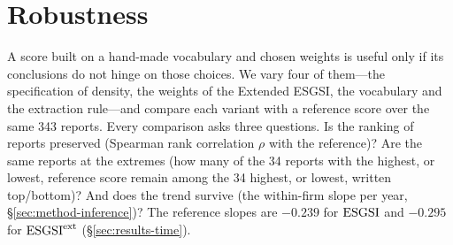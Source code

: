 \section{Robustness}
\label{sec:robustness}

A score built on a hand-made vocabulary and chosen weights is useful only if
its conclusions do not hinge on those choices. We vary four of them---the specification of density, the weights of the Extended
ESGSI, the vocabulary and the extraction rule---and compare each variant with a reference score
over the same 343 reports. Every comparison asks three questions. Is the
ranking of reports preserved (Spearman rank correlation $\rho$ with the
reference)? Are the same reports at the extremes (how many of the 34 reports
with the highest, or lowest, reference score remain among the 34 highest, or
lowest, written top/bottom)? And does the trend survive (the within-firm slope
per year, \S\ref{sec:method-inference})?
The reference slopes are $-0.239$ for $\mathrm{ESGSI}$ and $-0.295$ for $\mathrm{ESGSI}^{\mathrm{ext}}$
(\S\ref{sec:results-time}).

